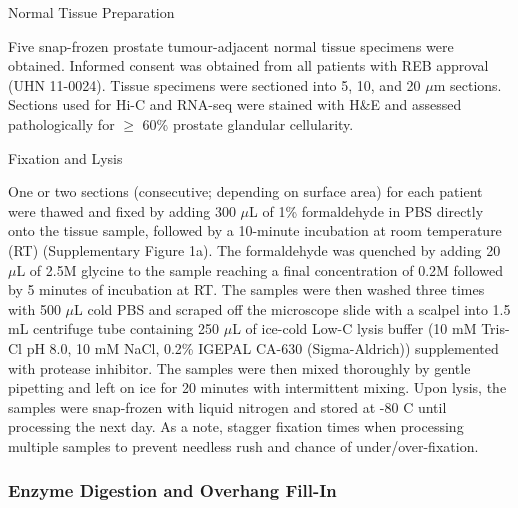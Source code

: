 Normal Tissue Preparation

Five snap-frozen prostate tumour-adjacent normal tissue specimens were obtained.
Informed consent was obtained from all patients with REB approval (UHN 11-0024).
Tissue specimens were sectioned into 5, 10, and 20 $\mu$m sections.
Sections used for Hi-C and RNA-seq were stained with H&E and assessed pathologically for $\ge$ 60\% prostate glandular cellularity.

Fixation and Lysis

One or two sections (consecutive; depending on surface area) for each patient were thawed and fixed by adding 300 $\mu$L of 1\% formaldehyde in PBS directly onto the tissue sample, followed by a 10-minute incubation at room temperature (RT) (Supplementary Figure 1a).
The formaldehyde was quenched by adding 20 $\mu$L of 2.5M glycine to the sample reaching a final concentration of 0.2M followed by 5 minutes of incubation at RT.
The samples were then washed three times with 500 $\mu$L cold PBS and scraped off the microscope slide with a scalpel into 1.5 mL centrifuge tube containing 250 $\mu$L of ice-cold Low-C lysis buffer (10 mM Tris-Cl pH 8.0, 10 mM NaCl, 0.2\% IGEPAL CA-630 (Sigma-Aldrich)) supplemented with protease inhibitor.
The samples were then mixed thoroughly by gentle pipetting and left on ice for 20 minutes with intermittent mixing.
Upon lysis, the samples were snap-frozen with liquid nitrogen and stored at -80 \textdegree C until processing the next day.
As a note, stagger fixation times when processing multiple samples to prevent needless rush and chance of under/over-fixation.

\subsubsection{Enzyme Digestion and Overhang Fill-In}

